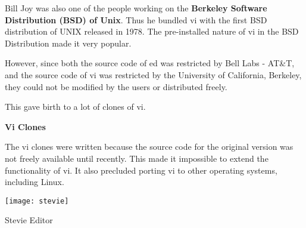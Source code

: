 Bill Joy was also one of the people working on the
\textbf{Berkeley Software Distribution (BSD) of Unix}.
Thus he bundled vi with the first BSD distribution of UNIX
released in 1978.
The pre-installed nature of vi in the BSD Distribution
made it very popular.

However, since both the source code of ed was restricted by
Bell Labs - AT\&T, and the source code of vi was restricted
by the University of California, Berkeley,
they could not be modified by the users or distributed freely.

This gave birth to a lot of clones of vi.

\textbf{Vi Clones}

The vi clones were written because the source code for the original version was not freely available until recently. This made it impossible to extend the functionality of vi. It also precluded porting vi to other operating systems, including Linux.

\begin{marginfigure}
  \texttt{[image: stevie]}
  \caption{Stevie Editor}
\end{marginfigure}

